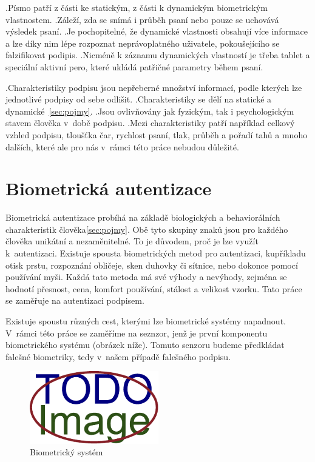 .Písmo patří z části ke statickým, z části k dynamickým biometrickým vlastnostem.                                                                                  %
.Záleží, zda se snímá i průběh psaní nebo pouze se uchovává výsledek psaní.                                                                                        %
.Je pochopitelné, že dynamické vlastnosti obsahují více informace a lze díky nim lépe rozpoznat neprávoplatného uživatele, pokoušejícího se falzifikovat podipis.  %
.Nicméně k záznamu dynamických vlastností je třeba tablet a speciální aktivní pero, které ukládá patřičné parametry během psaní.                                   %

.Charakteristiky podpisu jsou nepřeberné množství informací, podle kterých lze jednotlivé podpisy od sebe odlišit.
.Charakteristiky se dělí na statické a dynamické~\ref{sec:pojmy}. 
.Jsou ovlivňovány jak fyzickým, tak i psychologickým stavem člověka v~době podpisu.
.Mezi charakteristiky patří například celkový vzhled podpisu, tloušťka čar, rychlost psaní, tlak, průběh a pořadí tahů a mnoho dalších, které ale pro nás v~rámci této práce nebudou důležité. %

\section{Biometrická autentizace}
Biometrická autentizace probíhá na základě biologických a behaviorálních charakteristik člověka\ref{sec:pojmy}. 
Obě tyto skupiny znaků jsou pro každého člověka unikátní a nezaměnitelné. To je důvodem, proč je lze využít k~autentizaci.
Existuje spousta biometrických metod pro autentizaci, kupříkladu otisk prstu, rozpoznání obličeje, sken duhovky či sítnice, nebo dokonce pomocí používání myši. 
Každá tato metoda má své výhody a nevýhody, zejména se hodnotí přesnost, cena, komfort používání, stálost a velikost vzorku.
Tato práce se zaměřuje na autentizaci podpisem.

Existuje spoustu různých cest, kterými lze biometrické systémy napadnout.                                   %
V~rámci této práce se zaměříme na seznzor, jenž je první komponentu biometrického systému (obrázek níže).   %
Tomuto senzoru budeme předkládat falešné biometriky, tedy v~našem případě falešného podpisu.                %

\begin{figure}[h]
\centering
\includegraphics[width=0.5\textwidth]{obrazky-figures/placeholder.pdf}
\caption{Biometrický systém}
\label{fig:my-pdf}
\end{figure}

